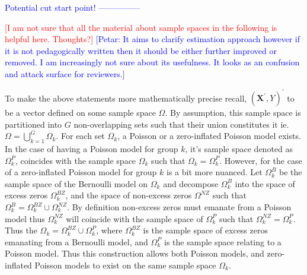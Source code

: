 \documentclass[12pt,letterpaper]{article}
\numberwithin{equation}{section}
\numberwithin{equation}{section}
\numberwithin{equation}{section}
\begin{document}
\textcolor{blue}{Potential cut start point! ---------------}

 \textcolor{red}{[I am not sure that all the material about sample spaces in the following is helpful here. Thoughts?]}  \textcolor{blue}{[Petar: It aims to clarify estimation approach however if it is not pedagogically written then it should be either further improved or removed. I am increasingly not sure about its usefulness. It looks as an confusion and attack surface for reviewers.]} 

	To make the above statements more mathematically precise recall, $(\bm {X^{'}}, Y)^{'}$ to be a vector defined on some sample space $\Omega$.   By assumption, this sample space is partitioned into $G$ non-overlapping sets such that their union constitutes it ie. $ \Omega = \bigcup_{k=1}^G \Omega_k $.	For each set $\Omega_k$, a Poisson or a zero-inflated Poisson model exists. In the case of having a Poisson model for group $k$, it's sample space denoted as $\Omega^P_k$, coincides with the sample space $\Omega_k$ such that  $\Omega_k = \Omega^P_k$.  However, for the case of a zero-inflated Poisson model for group $k$ is a bit more nuanced. Let $\Omega_k^{B}$ be the sample space of the Bernoulli  model on $\Omega_k$ and decompose $\Omega_k^{B}$ into the space of excess zeros $\Omega_k^{BZ}$, and the space of non-excess zeros $\Omega^{NZ}$ such that $\Omega_k^B = \Omega_k^{BZ} \cup \Omega_k^{NZ} $.   By definition non-excess zeros must emanate from a Poisson model thus $\Omega_k^{NZ} $ will coincide with the sample space of $\Omega^P_k$ such that $ \Omega_k^{NZ} =  \Omega^P_k$. Thus the  $\Omega_k = \Omega^{BZ}_k \cup \Omega^{P}_k $, where $\Omega^{BZ}_k$ is the sample space of excess zeros emanating from a Bernoulli model, and $\Omega^{P}_k$ is the sample space relating to a Poisson model. Thus this construction allows both Poisson models, and zero-inflated Poisson models to exist on the same sample space $\Omega_k$.   
	
\end{document}
